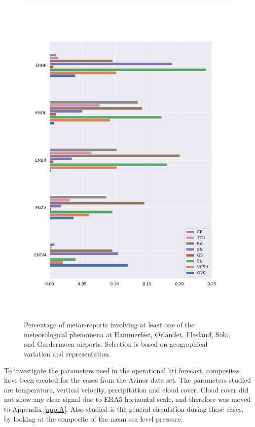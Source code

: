 \begin{figure}[H]
    \centering
    \includegraphics[width=.9\textwidth]{Figures/METAR_airports.pdf}
    \caption{Percentage of \acrshort{metar}-reports involving at least one of the meteorological phenomena at Hammerfest, Ørlandet, Flesland, Sola, and Gardermoen airports. Selection is based on geographical variation and representation.}
    \label{fig:metarclimat}
\end{figure}


To investigate the parameters used in the operational \acrshort{hti} forecast, composites have been created for the cases from the Avinor data set. The parameters studied are temperature, vertical velocity, precipitation and cloud cover. Cloud cover did not show any clear signal due to ERA5 horizontal scale, and therefore was moved to Appendix \ref{app:A}. Also studied is the general circulation during these cases, by looking at the composite of the mean sea level pressure. 

